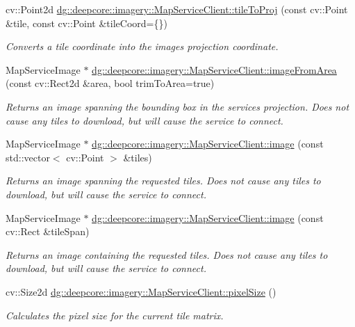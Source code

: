 \begin{DoxyCompactItemize}
cv\+::\+Point2d \hyperlink{group___imagery_module_ga16bfe2b02badb978b9faf6efc4e630ff}{dg\+::deepcore\+::imagery\+::\+Map\+Service\+Client\+::tile\+To\+Proj} (const cv\+::\+Point \&tile, const cv\+::\+Point \&tile\+Coord=\{\})
\begin{DoxyCompactList}\small\item\em Converts a tile coordinate into the image\textquotesingle{}s projection coordinate. \end{DoxyCompactList}\item 
Map\+Service\+Image $\ast$ \hyperlink{group___imagery_module_ga3526b9184dbdbe4402c0a3f73c2daeae}{dg\+::deepcore\+::imagery\+::\+Map\+Service\+Client\+::image\+From\+Area} (const cv\+::\+Rect2d \&area, bool trim\+To\+Area=true)
\begin{DoxyCompactList}\small\item\em Returns an image spanning the bounding box in the service\textquotesingle{}s projection. Does not cause any tiles to download, but will cause the service to connect. \end{DoxyCompactList}\item 
Map\+Service\+Image $\ast$ \hyperlink{group___imagery_module_ga950285a4f5f5a45562210ca27fb91b29}{dg\+::deepcore\+::imagery\+::\+Map\+Service\+Client\+::image} (const std\+::vector$<$ cv\+::\+Point $>$ \&tiles)
\begin{DoxyCompactList}\small\item\em Returns an image spanning the requested tiles. Does not cause any tiles to download, but will cause the service to connect. \end{DoxyCompactList}\item 
Map\+Service\+Image $\ast$ \hyperlink{group___imagery_module_gae8420c1898450274a950574a997d6ccd}{dg\+::deepcore\+::imagery\+::\+Map\+Service\+Client\+::image} (const cv\+::\+Rect \&tile\+Span)
\begin{DoxyCompactList}\small\item\em Returns an image containing the requested tiles. Does not cause any tiles to download, but will cause the service to connect. \end{DoxyCompactList}\item 
cv\+::\+Size2d \hyperlink{group___imagery_module_ga00d806ed6fd8737d485ad2eb844701e7}{dg\+::deepcore\+::imagery\+::\+Map\+Service\+Client\+::pixel\+Size} ()
\begin{DoxyCompactList}\small\item\em Calculates the pixel size for the current tile matrix. \end{DoxyCompactList}\item 

\end{DoxyCompactItemize}
